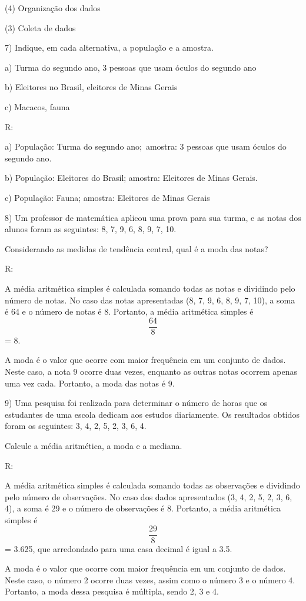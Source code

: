 (4) Organização dos dados

(3) Coleta de dados

7) Indique, em cada alternativa, a população e a amostra.

a) Turma do segundo ano, 3 pessoas que usam óculos do segundo ano

b) Eleitores no Brasil, eleitores de Minas Gerais

c) Macacos, fauna

R:

a) População: Turma do segundo ano;~amostra: 3 pessoas que usam óculos
do segundo ano.

b) População: Eleitores do Brasil; amostra: Eleitores de Minas Gerais.

c) População: Fauna; amostra: Eleitores de Minas Gerais

8) Um professor de matemática aplicou uma prova para sua turma, e as
notas dos alunos foram as seguintes: 8, 7, 9, 6, 8, 9, 7, 10.

Considerando as medidas de tendência central, qual é a moda das notas?

R:

A média aritmética simples é calculada somando todas as notas e
dividindo pelo número de notas. No caso das notas apresentadas (8, 7, 9,
6, 8, 9, 7, 10), a soma é 64 e o número de notas é 8. Portanto, a média
aritmética simples é \[\frac {64}{8}\] = 8.

A moda é o valor que ocorre com maior frequência em um conjunto de
dados. Neste caso, a nota 9 ocorre duas vezes, enquanto as outras notas
ocorrem apenas uma vez cada. Portanto, a moda das notas é 9.

9) Uma pesquisa foi realizada para determinar o número de horas que os
estudantes de uma escola dedicam aos estudos diariamente. Os resultados
obtidos foram os seguintes: 3, 4, 2, 5, 2, 3, 6, 4.

Calcule a média aritmética, a moda e a mediana.

R:

A média aritmética simples é calculada somando todas as observações e
dividindo pelo número de observações. No caso dos dados apresentados (3,
4, 2, 5, 2, 3, 6, 4), a soma é 29 e o número de observações é 8.
Portanto, a média aritmética simples é \[\frac {29}{8}\] = 3.625, que
arredondado para uma casa decimal é igual a 3.5.

A moda é o valor que ocorre com maior frequência em um conjunto de
dados. Neste caso, o número 2 ocorre duas vezes, assim como o número 3 e
o número 4. Portanto, a moda dessa pesquisa é múltipla, sendo 2, 3 e 4.

